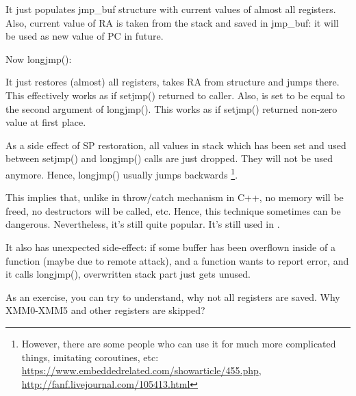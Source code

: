 It just populates jmp\_buf structure with current values of almost all registers.
Also, current value of \ac{RA} is taken from the stack and saved in jmp\_buf:
it will be used as new value of \ac{PC} in future.

Now longjmp():



It just restores (almost) all registers, takes \ac{RA} from structure and jumps there.
This effectively works as if setjmp() returned to caller.
Also,  is set to be equal to the second argument of longjmp().
This works as if setjmp() returned non-zero value at first place.

As a side effect of \ac{SP} restoration, all values in stack which has been set and used between setjmp() and longjmp()
calls are just dropped.
They will not be used anymore.
Hence, longjmp() usually jumps backwards
\footnote{However, there are some people who can use it for much more complicated things,
imitating coroutines, etc: \url{https://www.embeddedrelated.com/showarticle/455.php},
\url{http://fanf.livejournal.com/105413.html}}.

This implies that, unlike in throw/catch mechanism in C++, no memory will be freed, no destructors will be called, etc.
Hence, this technique sometimes can be dangerous.
Nevertheless, it's still quite popular. It's still used in \oracle.

It also has unexpected side-effect: if some buffer has been overflown inside of a function (maybe due to remote attack),
and a function wants to report error, and it calls longjmp(), overwritten stack part just gets unused.

As an exercise, you can try to understand, why not all registers are saved.
Why XMM0-XMM5 and other registers are skipped?

